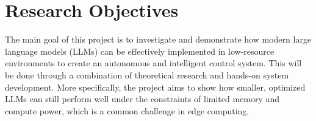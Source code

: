 \section{Research Objectives}
\label{sec:intro:goal}
The main goal of this project is to investigate and demonstrate how modern large language models (LLMs) can be effectively implemented in low-resource environments to create an autonomous and intelligent control system. This will be done through a combination of theoretical research and hands-on system development. More specifically, the project aims to show how smaller, optimized LLMs can still perform well under the constraints of limited memory and compute power, which is a common challenge in edge computing.

